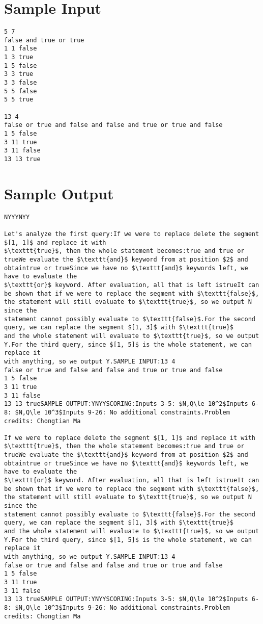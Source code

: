\documentclass[12pt]{article}
\begin{document}
\section*{Sample Input}
\begin{verbatim}
5 7
false and true or true
1 1 false
1 3 true
1 5 false
3 3 true
3 3 false
5 5 false
5 5 true

13 4
false or true and false and false and true or true and false
1 5 false
3 11 true
3 11 false
13 13 true
\end{verbatim}

\section*{Sample Output}
\begin{verbatim}
NYYYNYY

Let's analyze the first query:If we were to replace delete the segment $[1, 1]$ and replace it with
$\texttt{true}$, then the whole statement becomes:true and true or trueWe evaluate the $\texttt{and}$ keyword from at position $2$ and obtaintrue or trueSince we have no $\texttt{and}$ keywords left, we have to evaluate the
$\texttt{or}$ keyword. After evaluation, all that is left istrueIt can be shown that if we were to replace the segment with $\texttt{false}$,
the statement will still evaluate to $\texttt{true}$, so we output N since the
statement cannot possibly evaluate to $\texttt{false}$.For the second query, we can replace the segment $[1, 3]$ with $\texttt{true}$
and the whole statement will evaluate to $\texttt{true}$, so we output Y.For the third query, since $[1, 5]$ is the whole statement, we can replace it
with anything, so we output Y.SAMPLE INPUT:13 4
false or true and false and false and true or true and false
1 5 false
3 11 true
3 11 false
13 13 trueSAMPLE OUTPUT:YNYYSCORING:Inputs 3-5: $N,Q\le 10^2$Inputs 6-8: $N,Q\le 10^3$Inputs 9-26: No additional constraints.Problem credits: Chongtian Ma

If we were to replace delete the segment $[1, 1]$ and replace it with
$\texttt{true}$, then the whole statement becomes:true and true or trueWe evaluate the $\texttt{and}$ keyword from at position $2$ and obtaintrue or trueSince we have no $\texttt{and}$ keywords left, we have to evaluate the
$\texttt{or}$ keyword. After evaluation, all that is left istrueIt can be shown that if we were to replace the segment with $\texttt{false}$,
the statement will still evaluate to $\texttt{true}$, so we output N since the
statement cannot possibly evaluate to $\texttt{false}$.For the second query, we can replace the segment $[1, 3]$ with $\texttt{true}$
and the whole statement will evaluate to $\texttt{true}$, so we output Y.For the third query, since $[1, 5]$ is the whole statement, we can replace it
with anything, so we output Y.SAMPLE INPUT:13 4
false or true and false and false and true or true and false
1 5 false
3 11 true
3 11 false
13 13 trueSAMPLE OUTPUT:YNYYSCORING:Inputs 3-5: $N,Q\le 10^2$Inputs 6-8: $N,Q\le 10^3$Inputs 9-26: No additional constraints.Problem credits: Chongtian Ma


\end{verbatim}
\end{document}
